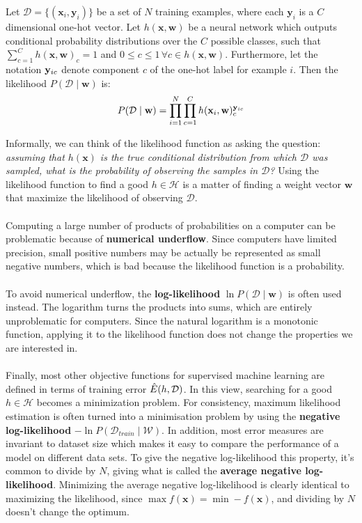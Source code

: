\begin{definition}
	\label{likelihood}
	Let $\mathcal{D} = \{(\mathbf{x}_i, \mathbf{y}_i)\}$ be a set of $N$ training examples, where each $\mathbf{y}_i$ is a $C$ dimensional one-hot vector. Let $h(\mathbf{x}, \mathbf{w})$ be a neural network which outputs conditional probability distributions over the $C$ possible classes, such that $\sum_{c=1}^C h(\mathbf{x}, \mathbf{w})_c = 1$ and $0 \leq c \leq 1 \,\forall c \in h(\mathbf{x}, \mathbf{w})$. Furthermore, let the notation $\mathbf{y}_{ic}$ denote component $c$ of the one-hot label for example $i$. Then the likelihood $P(\mathcal{D} \mid \mathbf{w})$ is:
	$$
	P(\mathcal{D} \mid \mathbf{w}) = \prod\limits_{i=1}^N\prod\limits_{c=1}^C h(\mathbf{x}_i, \mathbf{w})_c^{\mathbf{y}_{ic}}
	$$
\end{definition}
\noindent
Informally, we can think of the likelihood function as asking the question: \textit{assuming that $h(\mathbf{x})$ is the true conditional distribution from which $\mathcal{D}$ was sampled, what is the probability of observing the samples in $\mathcal{D}$?} Using the likelihood function to find a good $h \in \mathcal{H}$ is a matter of finding a weight vector $\mathbf{w}$ that maximize the likelihood of observing $\mathcal{D}$.
\\\\ 
Computing a large number of products of probabilities on a computer can be problematic because of \textbf{numerical underflow}. Since computers have limited precision, small positive numbers may be actually be represented as small negative numbers, which is bad because the likelihood function is a probability.
\\\\
To avoid numerical underflow, the \textbf{log-likelihood} $\ln P(\mathcal{D} \mid \mathbf{w})$ is often used instead. The logarithm turns the products into sums, which are entirely unproblematic for computers. Since the natural logarithm is a monotonic function, applying it to the likelihood function does not change the properties we are interested in.
\\\\
Finally, most other objective functions for supervised machine learning are defined in terms of training error $\hat{E}(h, \mathcal{D})$. In this view, searching for a good $h \in \mathcal{H}$ becomes a minimization problem. For consistency, maximum likelihood estimation is often turned into a minimisation problem by using the \textbf{negative log-likelihood} $-\ln P(\mathcal{D}_{train} \mid \mathcal{W})$. In addition, most error measures are invariant to dataset size which makes it easy to compare the performance of a model on different data sets. To give the negative log-likelihood this property, it's common to divide by $N$, giving what is called the \textbf{average negative log-likelihood}. Minimizing the average negative log-likelihood is clearly identical to maximizing the likelihood, since $\max f(\mathbf{x}) = \min -f(\mathbf{x})$, and dividing by $N$ doesn't change the optimum.

